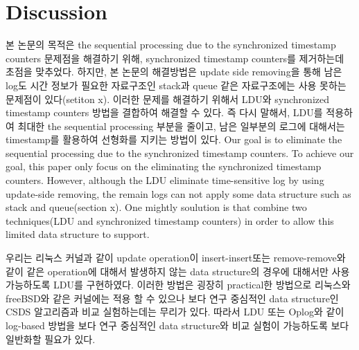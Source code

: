 \section{Discussion}

\ifkor
본 논문의 목적은 the sequential processing due to the synchronized timestamp counters
문제점을 해결하기 위해, synchronized timestamp counters를 제거하는데 초점을 맞추었다.
하지만, 본 논문의 해결방법은 update side removing을 통해 남은 log도 시간 정보가 필요한
자료구조인 stack과 queue 같은 자료구조에는 사용 못하는 문제점이 있다(setiton x).
이러한 문제를 해결하기 위해서  LDU와 synchronized timestamp counters 방법을 
결합하여 해결할 수 있다.
즉 다시 말해서, LDU를 적용하여 최대한  the sequential processing 부분을 줄이고, 
남은 일부분의 로그에 대해서는 timestamp를 활용하여 선형화를 지키는 방법이 있다. 
\else
Our goal is to eliminate the sequential processing due to the synchronized
timestamp counters.
To achieve our goal, this paper only focus on the eliminating the synchronized
timestamp counters.
However, although the LDU eliminate time-sensitive log by using update-side
removing, the remain logs can not apply some data structure such as stack and
queue(section x).
One mightly soulution is that combine two techniques(LDU and synchronized
timestamp counters) in order to allow this limited data structure to support.

\fi



\ifkorthesis
우리는 리눅스 커널과 같이 update operation이 insert-insert또는 remove-remove와 같이 같은 operation에
대해서 발생하지 않는 data structure의 경우에 대해서만 사용 가능하도록 LDU를 구현하였다.
이러한 방법은 굉장히 practical한 방법으로 리눅스와 freeBSD와 같은 커널에는 적용 할 수 있으나 
보다 연구 중심적인 data structure인 CSDS 알고리즘과 비교 실험하는데는 무리가 있다. 
따라서 LDU 또는 Oplog와 같이 log-based 방법을 보다 연구 중심적인 data structure와 비교 실험이
가능하도록 보다 일반화할 필요가 있다. 
\else


